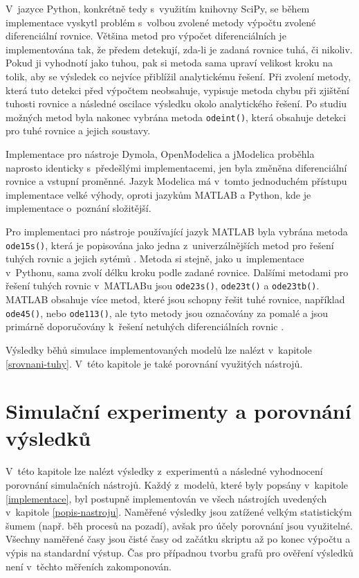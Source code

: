 V~jazyce Python, konkrétně tedy s~využitím knihovny SciPy, se během implementace vyskytl problém s~volbou zvolené metody výpočtu zvolené diferenciální rovnice. Většina metod pro výpočet diferenciálních je implementována tak, že předem detekují, zda-li je zadaná rovnice tuhá, či nikoliv. Pokud ji vyhodnotí jako tuhou, pak si metoda sama upraví velikost kroku na tolik, aby se výsledek co nejvíce přiblížil analytickému řešení. Při zvolení metody, která tuto detekci před výpočtem neobsahuje, vypisuje metoda chybu při zjištění tuhosti rovnice a následné oscilace výsledku okolo analytického řešení. Po studiu možných metod byla nakonec vybrána metoda \texttt{odeint()}, která obsahuje detekci pro tuhé rovnice a jejich soustavy.

Implementace pro nástroje Dymola, OpenModelica a jModelica proběhla naprosto identicky s~předešlými implementacemi, jen byla změněna diferenciální rovnice a vstupní proměnné. Jazyk Modelica má v~tomto jednoduchém přístupu implementace velké výhody, oproti jazykům MATLAB a Python, kde je implementace o~poznání složitější.

Pro implementaci pro nástroje používající jazyk MATLAB byla vybrána metoda \texttt{ode15s()}, která je popisována jako jedna z~univerzálnějších metod pro řešení tuhých rovnic a jejich sytémů \cite{MATLAB:2010}. Metoda si stejně, jako u~implementace v~Pythonu, sama zvolí délku kroku podle zadané rovnice. Dalšími metodami pro řešení tuhých rovnic v~MATLABu jsou \texttt{ode23s()}, \texttt{ode23t()} a \texttt{ode23tb()}. MATLAB obsahuje více metod, které jsou schopny řešit tuhé rovnice, například \texttt{ode45()}, nebo \texttt{ode113()}, ale tyto metody jsou označovány za pomalé a jsou primárně doporučovány k~řešení netuhých diferenciálních rovnic \cite{MATLAB:2010}.

Výsledky běhů simulace implementovaných modelů lze nalézt v~kapitole \ref{srovnani-tuhy}. V~této kapitole je také porovnání využitých nástrojů.

\chapter{Simulační experimenty a porovnání výsledků}
\label{kapitola5}
V~této kapitole lze nalézt výsledky z~experimentů a následné vyhodnocení porovnání simulačních nástrojů. Každý z~modelů, které byly popsány v~kapitole \ref{implementace}, byl postupně implementován ve všech nástrojích uvedených v~kapitole \ref{popis-nastroju}. Naměřené výsledky jsou zatížené velkým statistickým šumem (např. běh procesů na pozadí), avšak pro účely porovnání jsou využitelné. Všechny naměřené časy jsou čisté časy od začátku skriptu až po konec výpočtu a výpis na standardní výstup. Čas pro případnou tvorbu grafů pro ověření výsledků není v~těchto měřeních zakomponován.


